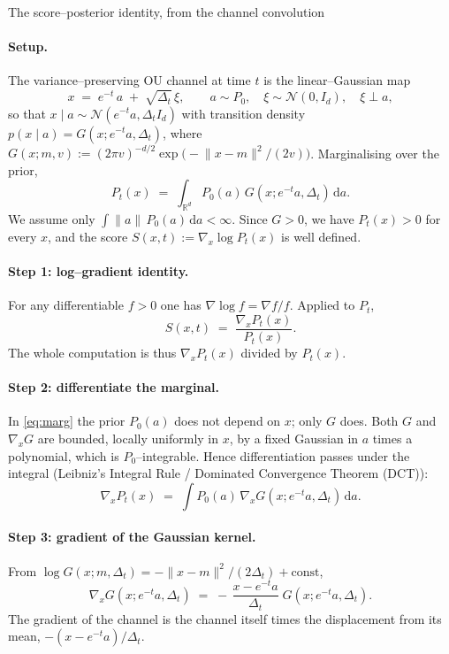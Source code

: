 \begin{toolbox}[tb:sm-tweedie]{The score--posterior identity, from the channel convolution}

\paragraph{Setup.}
The variance--preserving OU channel at time $t$ is the linear--Gaussian map
\[
  x \;=\; e^{-t}\,a \;+\; \sqrt{\Delta_t}\,\xi,
  \qquad a\sim P_0,\quad \xi\sim\mathcal N(0,I_d),\quad \xi\perp a ,
\]
so that $x\mid a\sim\mathcal N(e^{-t}a,\Delta_t I_d)$ with transition density
$p(x\mid a)=G(x;e^{-t}a,\Delta_t)$, where
$G(x;m,v):=(2\pi v)^{-d/2}\exp\!\big(-\lVert x-m\rVert^2/(2v)\big)$.
Marginalising over the prior,
\begin{equation}
  P_t(x)\;=\;\int_{\mathbb R^d} P_0(a)\,G(x;e^{-t}a,\Delta_t)\,\mathrm da .
  \label{eq:marg}
\end{equation}
We assume only $\int\lVert a\rVert\,P_0(a)\,\mathrm da<\infty$. Since $G>0$, we have
$P_t(x)>0$ for every $x$, and the score $S(x,t):=\nabla_x\log P_t(x)$ is well defined.

\paragraph{Step 1: log--gradient identity.}
For any differentiable $f>0$ one has $\nabla\log f=\nabla f/f$. Applied to $P_t$,
\begin{equation}
  S(x,t)\;=\;\frac{\nabla_x P_t(x)}{P_t(x)} .
  \label{eq:loggrad}
\end{equation}
The whole computation is thus $\nabla_x P_t(x)$ divided by $P_t(x)$.

\paragraph{Step 2: differentiate the marginal.}
In \eqref{eq:marg} the prior $P_0(a)$ does not depend on $x$; only $G$ does. Both $G$
and $\nabla_x G$ are bounded, locally uniformly in $x$, by a fixed Gaussian in $a$ times
a polynomial, which is $P_0$--integrable. Hence differentiation passes under the integral (Leibniz's Integral Rule / Dominated Convergence Theorem (DCT)):
\begin{equation}
  \nabla_x P_t(x)\;=\;\int P_0(a)\,\nabla_x G(x;e^{-t}a,\Delta_t)\,\mathrm da .
  \label{eq:diffunder}
\end{equation}

\paragraph{Step 3: gradient of the Gaussian kernel.}
From $\log G(x;m,\Delta_t)=-\lVert x-m\rVert^2/(2\Delta_t)+\text{const}$,
\begin{equation}
  \nabla_x G(x;e^{-t}a,\Delta_t)
  \;=\;-\,\frac{x-e^{-t}a}{\Delta_t}\;G(x;e^{-t}a,\Delta_t) .
  \label{eq:kernelgrad}
\end{equation}
The gradient of the channel is the channel itself times the displacement from its mean,
$-(x-e^{-t}a)/\Delta_t$.


\end{toolbox}
